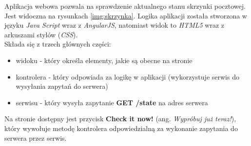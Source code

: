 \begin{center}
	\label{img:skrzynka}
\end{center}

Aplikacja webowa pozwala na sprawdzenie aktualnego stanu skrzynki pocztowej. Jest widoczna na rysunkach \ref{img:skrzynka}.
Logika aplikacji została stworzona w języku \textit{Java Script} wraz z \textit{AngularJS}, natomiast widok to \textit{HTML5} wraz z arkuszami stylów (\textit{CSS}).\\

Składa się z trzech głównych części:
\begin{itemize}
\item widoku - który określa elementy, jakie są obecne na stronie
\item kontrolera - który odpowiada za logikę w aplikacji (wykorzystuje serwis do wysyłania zapytań do serwera)
\item serwisu - który wysyła zapytanie \textbf{GET /state} na adres serwera
\end{itemize}

Na stronie dostępny jest przycisk \textbf{Check it now!} (ang. \textit{Wypróbuj już teraz!}), który wywołuje metodę kontrolera odpowiedzialną za wykonanie zapytania do serwera przez serwis.

\begin{center}
	\label{img:web_diagram}
\end{center}

